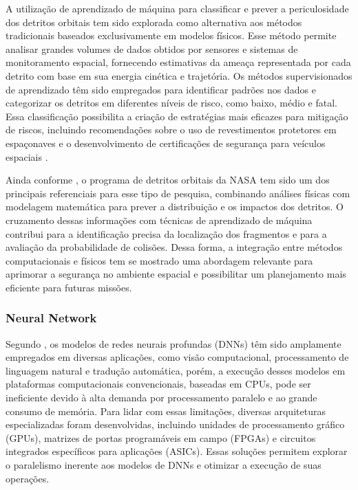 A utilização de aprendizado de máquina para classificar e prever a periculosidade dos detritos orbitais tem sido explorada como alternativa aos métodos tradicionais baseados exclusivamente em modelos físicos. Esse método permite analisar grandes volumes de dados obtidos por sensores e sistemas de monitoramento espacial, fornecendo estimativas da ameaça representada por cada detrito com base em sua energia cinética e trajetória. Os métodos supervisionados de aprendizado têm sido empregados para identificar padrões nos dados e categorizar os detritos em diferentes níveis de risco, como baixo, médio e fatal. Essa classificação possibilita a criação de estratégias mais eficazes para mitigação de riscos, incluindo recomendações sobre o uso de revestimentos protetores em espaçonaves e o desenvolvimento de certificações de segurança para veículos espaciais \cite{sri2024}.

Ainda conforme \cite{sri2024}, o programa de detritos orbitais da NASA tem sido um dos principais referenciais para esse tipo de pesquisa, combinando análises físicas com modelagem matemática para prever a distribuição e os impactos dos detritos. O cruzamento dessas informações com técnicas de aprendizado de máquina contribui para a identificação precisa da localização dos fragmentos e para a avaliação da probabilidade de colisões. Dessa forma, a integração entre métodos computacionais e físicos tem se mostrado uma abordagem relevante para aprimorar a segurança no ambiente espacial e possibilitar um planejamento mais eficiente para futuras missões.

\subsubsection{Neural Network}

Segundo \cite{ke2018}, os modelos de redes neurais profundas (DNNs) têm sido amplamente empregados em diversas aplicações, como visão computacional, processamento de linguagem natural e tradução automática, porém, a execução desses modelos em plataformas computacionais convencionais, baseadas em CPUs, pode ser ineficiente devido à alta demanda por processamento paralelo e ao grande consumo de memória. Para lidar com essas limitações, diversas arquiteturas especializadas foram desenvolvidas, incluindo unidades de processamento gráfico (GPUs), matrizes de portas programáveis em campo (FPGAs) e circuitos integrados específicos para aplicações (ASICs). Essas soluções permitem explorar o paralelismo inerente aos modelos de DNNs e otimizar a execução de suas operações.

